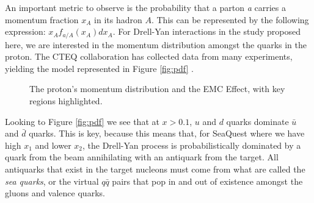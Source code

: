An important metric to observe is the probability that a parton \emph{a} carries a momentum fraction $x_A$ in its hadron $A$.  This can be represented by the following expression: $x_A f_{a/A}(x_A)dx_A$. For Drell-Yan interactions in the study proposed here, we are interested in the momentum distribution amongst the quarks in the proton.  The CTEQ collaboration has collected data from many experiments, yielding the model represented in Figure \ref{fig:pdf} \cite{Pumplin:2002vw}.

\begin{figure}
	\centering
	\hspace{8pt}%
	\caption{The proton's momentum distribution and the EMC Effect, with key regions highlighted.}
	\label{fig:pdf_emc}
\end{figure}

Looking to Figure \ref{fig:pdf} we see that at $x>0.1$, $u$ and $d$ quarks dominate $\bar{u}$ and $\bar{d}$ quarks.  This is key, because this means that, for SeaQuest where we have high $x_1$ and lower $x_2$, the Drell-Yan process is probabilistically dominated by a quark from the beam annihilating with an antiquark from the target. All antiquarks that exist in the target nucleons must come from what are called the \emph{sea quarks}, or the virtual $q\bar{q}$ pairs that pop in and out of existence amongst the gluons and valence quarks. 


